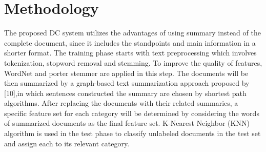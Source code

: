 \documentclass{sigchi}
\begin{document}
\section{Methodology}\label{sectionMethodology}
The proposed DC system utilizes the advantages of using
summary instead of the complete document, since it includes
the standpoints and main information in a shorter format.
The training phase starts with text preprocessing which
involves tokenization, stopword removal and stemming. To
improve the quality of features, WordNet and porter stemmer
are applied in this step. The documents will be then
summarized by a graph-based text summarization approach
proposed by [10],in which sentences constructed the summary
are chosen by shortest path algorithms. After replacing the
documents with their related summaries, a specific feature set
for each category will be determined by considering the words
of summarized documents as the final feature set. K-Nearest
Neighbor (KNN) algorithm is used in the test phase to classify
unlabeled documents in the test set and assign each to its
relevant category.
\end{document}
